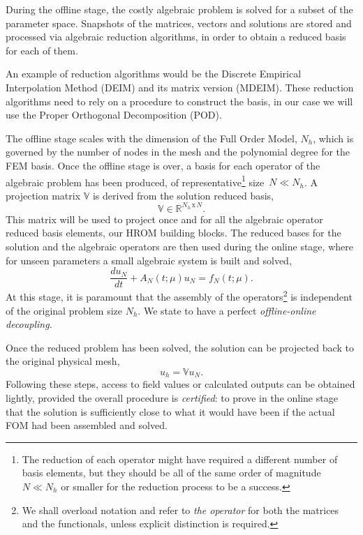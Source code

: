 During the offline stage, the costly algebraic problem is solved for a subset of the parameter space.
Snapshots of the matrices, vectors and solutions are stored and processed via algebraic reduction algorithms, 
in order to obtain a reduced basis for each of them.

An example of reduction algorithms would be the Discrete Empirical Interpolation Method (DEIM) 
and its matrix version (MDEIM).
These reduction algorithms need to rely on a procedure to construct the basis, 
in our case we will use the Proper Orthogonal Decomposition (POD). 

The offline stage scales with the dimension of the Full Order Model, $N_h$, 
which is governed by the number of nodes in the mesh and the polynomial degree for the FEM basis.
Once the offline stage is over, a basis for each operator of the algebraic problem has been produced, 
of representative\footnote{
   The reduction of each operator might have required a different number of basis elements, 
   but they should be all of the same order of magnitude $N \ll N_h$ or smaller for the reduction process to be a success.}
size~$N \ll N_h$.
A projection matrix $\mathbb{V}$ is derived from the solution reduced basis, 
\begin{equation}
   \mathbb{V} \in \mathbb{R}^{N_h \,\text{x}\, N}.
\end{equation} 
This matrix will be used to project once and for all 
the algebraic operator reduced basis elements, 
our HROM building blocks.
The reduced bases for the solution and the algebraic operators 
are then used during the online stage, 
where for unseen parameters a small algebraic system is built and solved,
\begin{equation}
   \frac{du_N}{dt} + A_N\left(t;\mu\right) u_N = f_N\left(t;\mu\right).
\end{equation}
At this stage, it is paramount that the assembly of the operators\footnote{
   We shall overload notation and refer to \textit{the operator} for both the matrices and the functionals,
   unless explicit distinction is required.
} 
is independent of the original problem size $N_h$.
We state to have a perfect \textit{offline-online decoupling}.

Once the reduced problem has been solved, the solution can be projected back to the original physical mesh,
\begin{equation}
   u_h = \mathbb{V} u_N.
\end{equation}
Following these steps, access to field values or calculated outputs can be obtained lightly, 
provided the overall procedure is \textit{certified}: 
to prove in the online stage that the solution is sufficiently close 
to what it would have been if the actual FOM had been assembled and solved.

